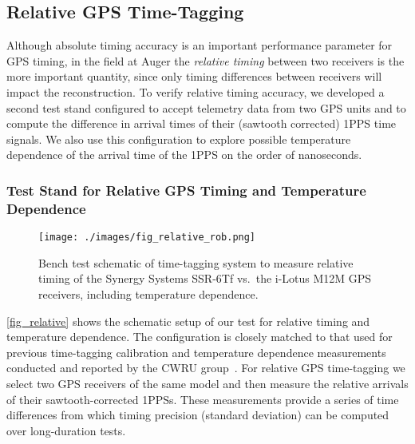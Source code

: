 \subsection{Relative GPS Time-Tagging}

Although absolute timing accuracy is an important performance
parameter for GPS timing, in the field at Auger the {\em
  relative timing} between two receivers is the more important
quantity, since only timing differences between receivers will impact
the reconstruction.  To verify relative timing accuracy, we developed
a second test stand configured to accept telemetry data from two GPS
units and to compute the difference in arrival times of their
(sawtooth corrected) 1PPS time signals. We also use this configuration
to explore possible temperature dependence of the arrival time of the
1PPS on the order of nanoseconds. 


\subsubsection{Test Stand for Relative GPS Timing and Temperature Dependence} 


\begin{figure}[H]
\centering
\texttt{[image: ./images/fig\_relative\_rob.png]}
\caption[Relative Timing Test Diagram]{Bench test schematic of time-tagging system to measure relative timing of the Synergy Systems SSR-6Tf vs.~the i-Lotus M12M GPS receivers, including temperature dependence.}
\label{fig_relative}
\end{figure}

\autoref{fig_relative} shows the schematic setup of our test
for relative timing and temperature dependence.  The configuration is
closely matched to that used for previous time-tagging calibration and
temperature dependence measurements conducted and reported by the
CWRU group~\cite{brandt}. For relative GPS time-tagging we select two GPS
receivers of the same model and then measure the relative arrivals of their sawtooth-corrected 1PPSs. These measurements provide a series of time differences from which timing precision (standard deviation) can be computed over long-duration tests.



